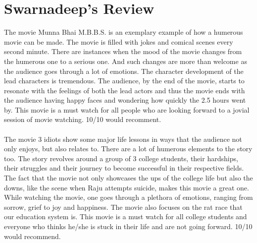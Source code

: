 \documentclass{article}
\begin{document}
\section{Swarnadeep's Review}
The movie Munna Bhai M.B.B.S. is an exemplary example of how a humerous movie can be made. The movie is filled with jokes and comical scenes every second minute. There are instances when the mood of the movie changes from the humerous one to a serious one. And such changes are more than welcome as the audience goes through a lot of emotions. The character development of the lead characters is tremendous. The audience, by the end of the movie, starts to resonate with the feelings of both the lead actors and thus the movie ends with the audience having happy faces and wondering how quickly the 2.5 hours went by. This movie is a must watch for all people who are looking forward to a jovial session of movie watching. 10/10 would recomment. \\ \\
The movie 3 idiots show some major life lessons in ways that the audience not only enjoys, but also relates to. There are a lot of humerous elements to the story too. The story revolves around a group of 3 college students, their hardships, their struggles and their journey to become successful in their respective fields. The fact that the movie not only showcases the ups of the college life but also the downs, like the scene when Raju attempts suicide, makes this movie a great one. While watching the movie, one goes through a plethora of emotions, ranging from sorrow, grief to joy and happiness. The movie also focuses on the rat race that our education system is. This movie is a must watch for all college students and everyone who thinks he/she is stuck in their life and are not going forward. 10/10 would recommend.
\end{document}
